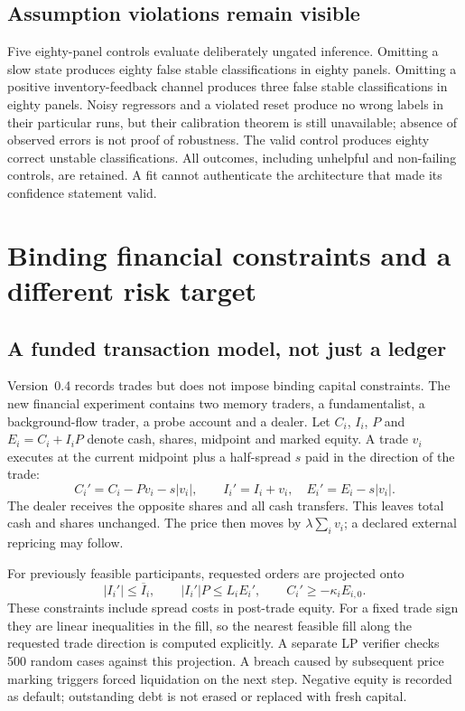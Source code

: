 \documentclass[11pt,a4paper]{article}
\theoremstyle{definition}
\theoremstyle{remark}
\begin{document}
\subsection{Assumption violations remain visible}
Five eighty-panel controls evaluate deliberately ungated inference. Omitting a slow state produces eighty false stable classifications in eighty panels. Omitting a positive inventory-feedback channel produces three false stable classifications in eighty panels. Noisy regressors and a violated reset produce no wrong labels in their particular runs, but their calibration theorem is still unavailable; absence of observed errors is not proof of robustness. The valid control produces eighty correct unstable classifications. All outcomes, including unhelpful and non-failing controls, are retained. A fit cannot authenticate the architecture that made its confidence statement valid.

\section{Binding financial constraints and a different risk target}
\label{sec:binding_finance}
\subsection{A funded transaction model, not just a ledger}
Version~0.4 records trades but does not impose binding capital constraints. The new financial experiment contains two memory traders, a fundamentalist, a background-flow trader, a probe account and a dealer. Let $C_i$, $I_i$, $P$ and $E_i=C_i+I_iP$ denote cash, shares, midpoint and marked equity. A trade $v_i$ executes at the current midpoint plus a half-spread $s$ paid in the direction of the trade:
\begin{equation}
 C_i'=C_i-Pv_i-s|v_i|,\qquad I_i'=I_i+v_i,
 \quad E_i'=E_i-s|v_i|.
 \label{eq:funded_settlement}
\end{equation}
The dealer receives the opposite shares and all cash transfers. This leaves total cash and shares unchanged. The price then moves by $\lambda\sum_i v_i$; a declared external repricing may follow.

For previously feasible participants, requested orders are projected onto
\begin{equation}
 |I_i'|\le \overline I_i,\qquad |I_i'|P\le L_i E_i',\qquad
 C_i'\ge-\kappa_i E_{i,0}.
 \label{eq:binding_limits}
\end{equation}
These constraints include spread costs in post-trade equity. For a fixed trade sign they are linear inequalities in the fill, so the nearest feasible fill along the requested trade direction is computed explicitly. A separate LP verifier checks 500 random cases against this projection. A breach caused by subsequent price marking triggers forced liquidation on the next step. Negative equity is recorded as default; outstanding debt is not erased or replaced with fresh capital.
\end{document}
